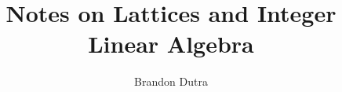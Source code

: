 \documentclass[12pt]{amsbook}
\theoremstyle{definition}
\numberwithin{section}{chapter}
\numberwithin{equation}{chapter}
\begin{document}
\frontmatter

\title{Notes on Lattices and Integer Linear Algebra}


\author{Brandon Dutra}
\address{Department of Mathematics, University of California, Davis}
\curraddr{}

\maketitle


	



\setcounter{page}{4}

\tableofcontents


\mainmatter









\end{document}
